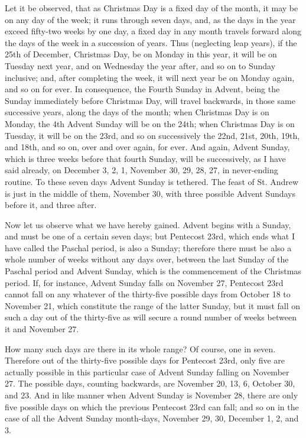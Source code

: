 Let it be observed, that as
Christmas Day is a fixed day of the month, it may be on any day of the
week; it runs through seven days, and, as the days in the year exceed fifty-two weeks by one day, a fixed day in any month travels
forward along the days of the week in a succession of years. Thus
(neglecting leap years), if the 25th of December, Christmas Day, be on
Monday in this year, it will be on Tuesday next year, and on Wednesday
the year after, and so on to Sunday inclusive; and, after completing
the week, it will next year be on Monday again, and so on for ever. In
consequence, the Fourth Sunday in Advent, being the Sunday immediately
before Christmas Day, will travel backwards, in those same successive
years, along the days of the month; when Christmas Day is on Monday,
the 4th Advent Sunday will be on the 24th; when Christmas Day is on
Tuesday, it will be on the 23rd, and so on successively the 22nd,
21st, 20th, 19th, and 18th, and so on, over and over again, for ever.
And again, Advent Sunday, which is three weeks before that fourth
Sunday, will be successively, as I have said already, on December 3,
2, 1, November 30, 29, 28, 27, in never-ending routine. To these seven
days Advent Sunday is tethered. The feast of St. Andrew is just in the
middle of them, November 30, with three possible Advent Sundays before
it, and three after.

Now let us observe what we
have hereby gained. Advent begins with a Sunday, and must be one of a
certain seven days; but Pentecost 23rd, which ends what I have called
the Paschal period, is also a Sunday; therefore there must be also a
whole number of weeks without any days over, between the last Sunday
of the Paschal period and Advent Sunday, which is the commencement of
the Christmas period. If, for instance, Advent Sunday falls on
November 27, Pentecost 23rd cannot fall on any whatever of the
thirty-five possible days from October 18 to November 21, which
constitute the range of the latter Sunday, but it must fall on such a
day out of the thirty-five as will secure a round number of weeks
between it and November 27.

How many such days are there
in its whole range? Of course, one in seven. Therefore out of the
thirty-five possible days for Pentecost 23rd, only five are actually
possible in this particular case of Advent Sunday falling on November
27. The possible days, counting backwards, are November 20, 13, 6,
October 30, and 23. And in like manner when Advent Sunday is November
28, there are only five possible days on which the previous Pentecost
23rd can fall; and so on in the case of all the Advent Sunday
month-days, November 29, 30, December 1, 2, and 3.

